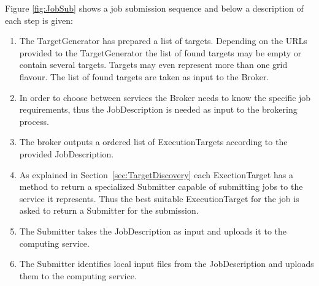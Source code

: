 \documentclass{book}
\begin{document}
\begin{figure}[ht]
\end{figure}

Figure \ref{fig:JobSub} shows a job submission sequence and below a description of each step is given:

\begin{enumerate}
\item{The TargetGenerator has prepared a list of targets. Depending on the URLs provided to the TargetGenerator the list of 
found targets may be empty or contain several targets. Targets may even represent more than one grid flavour. The list of 
found targets are taken as input to the Broker.}
\item{In order to choose between services the Broker needs to know the specific job requirements, thus the JobDescription is 
needed as input to the brokering process.}
\item{The broker outputs a ordered list of ExecutionTargets according to the provided JobDescription.}
\item{As explained in Section~\ref{sec:TargetDiscovery} each ExectionTarget has a method to return a specialized Submitter 
capable of submitting jobs to the service it represents. Thus the best suitable ExecutionTarget for the job is asked to return 
a Submitter for the submission.}
\item{The Submitter takes the JobDescription as input and uploads it to the computing service.}
\item{The Submitter identifies local input files from the JobDescription and uploads them to the computing service.}
\end{enumerate}
\end{document}
